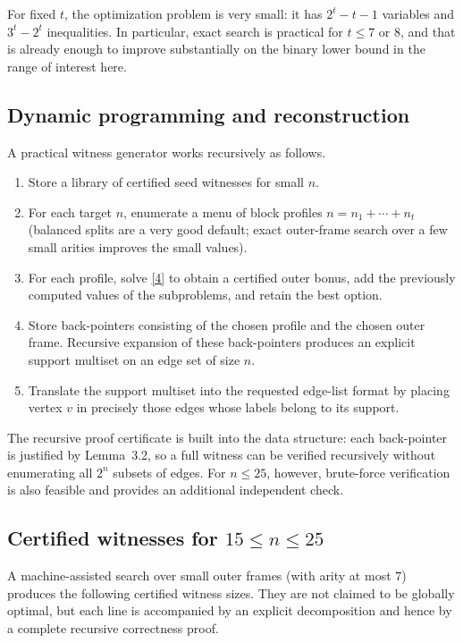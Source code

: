 \documentclass[11pt]{article}
\begin{document}
For fixed $t$, the optimization problem is very small: it has $2^t - t - 1$ variables and $3^t - 2^t$ inequalities. In particular, exact search is practical for $t \le 7$ or $8$, and that is already enough to improve substantially on the binary lower bound in the range of interest here.

\subsection{Dynamic programming and reconstruction}

A practical witness generator works recursively as follows.

\begin{enumerate}[leftmargin=2em]
\item Store a library of certified seed witnesses for small $n$.
\item For each target $n$, enumerate a menu of block profiles $n = n_1 + \cdots + n_t$ (balanced splits are a very good default; exact outer-frame search over a few small arities improves the small values).
\item For each profile, solve \eqref{4} to obtain a certified outer bonus, add the previously computed values of the subproblems, and retain the best option.
\item Store back-pointers consisting of the chosen profile and the chosen outer frame. Recursive expansion of these back-pointers produces an explicit support multiset on an edge set of size $n$.
\item Translate the support multiset into the requested edge-list format by placing vertex $v$ in precisely those edges whose labels belong to its support.
\end{enumerate}

The recursive proof certificate is built into the data structure: each back-pointer is justified by Lemma~3.2, so a full witness can be verified recursively without enumerating all $2^n$ subsets of edges. For $n \le 25$, however, brute-force verification is also feasible and provides an additional independent check.

\subsection{Certified witnesses for $15 \le n \le 25$}

A machine-assisted search over small outer frames (with arity at most $7$) produces the following certified witness sizes. They are not claimed to be globally optimal, but each line is accompanied by an explicit decomposition and hence by a complete recursive correctness proof.
\end{document}
